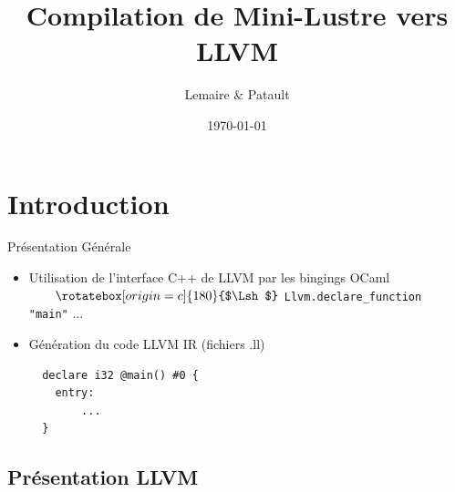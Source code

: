 \documentclass{beamer} %
\title[Luste $\mapsto$ LLVM]{Compilation de Mini-Lustre vers LLVM}
\institute[UPSaclay]{Université Paris-Saclay}
\author{Lemaire \& Patault}
\date{\today}
\newcommand{\ocaml}[1]{\texttt{#1}}
\newcommand{\angArr}{
    \rotatebox[origin=c]{180}{$\Lsh$}
}
\begin{document}

\begin{frame}
    \titlepage
\end{frame}

\section{Introduction}

\begin{frame}
    \tableofcontents[currentsection]
\end{frame}

\begin{frame}[fragile]{Présentation Générale}
            \vfill
    \begin{itemize}
        \item
            Utilisation de l'interface C++ de LLVM par les bingings OCaml\\\vspace*{0.2cm}
            $\qquad\angArr$ \ocaml{Llvm.declare_function "main"} ...

        \vspace*{1cm}\item
            Génération du code LLVM IR (fichiers .ll)
  \begin{verbatim}
  declare i32 @main() #0 {
    entry:
        ...
  }
   \end{verbatim}
    \end{itemize}
            \vfill
\end{frame}

\subsection{Présentation LLVM}
\end{document}
